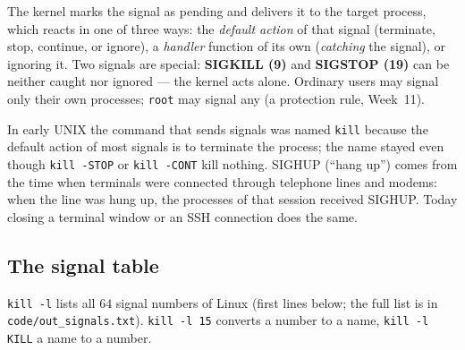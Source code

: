 \documentclass[11pt,a4paper]{article}
\newcommand{\cmd}[1]{\texttt{#1}}
\begin{document}
The kernel marks the signal as pending and delivers it to the target process, which reacts in one of three ways: the \emph{default action} of that signal (terminate, stop, continue, or ignore), a \emph{handler} function of its own (\emph{catching} the signal), or ignoring it. Two signals are special: \textbf{SIGKILL (9)} and \textbf{SIGSTOP (19)} can be neither caught nor ignored --- the kernel acts alone. Ordinary users may signal only their own processes; \texttt{root} may signal any (a protection rule, Week~11).

\begin{histnote}
In early UNIX the command that sends signals was named \cmd{kill} because the default action of most signals is to terminate the process; the name stayed even though \cmd{kill -STOP} or \cmd{kill -CONT} kill nothing. SIGHUP (``hang up'') comes from the time when terminals were connected through telephone lines and modems: when the line was hung up, the processes of that session received SIGHUP. Today closing a terminal window or an SSH connection does the same.
\end{histnote}

\subsection{The signal table}
\label{sec:sigtable}

\cmd{kill -l} lists all $64$ signal numbers of Linux (first lines below; the full list is in \texttt{code/out\_signals.txt}). \cmd{kill -l 15} converts a number to a name, \cmd{kill -l KILL} a name to a number.


\end{document}
